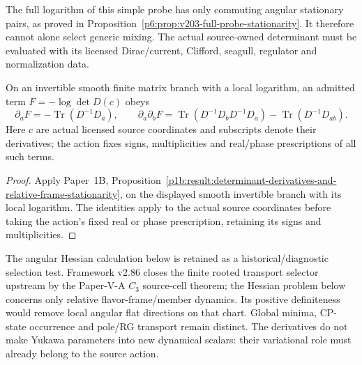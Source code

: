 \documentclass[12pt,a4paper]{article}
\begin{document}
The full logarithm of this simple probe has only commuting angular
stationary pairs, as proved in
Proposition~\ref{p6:prop:v203-full-probe-stationarity}. It therefore
cannot alone select generic mixing. The actual source-owned determinant
must be evaluated with its licensed Dirac/current, Clifford, seagull,
regulator and normalization data.

\begin{proposition}
\label{p6:prop:v203-native-determinant-derivatives}
On an invertible smooth finite matrix branch with a local logarithm,
an admitted term $F=-\log\det D(c)$ obeys
\[
 \partial_aF=-\operatorname{Tr}(D^{-1}D_a),\qquad
 \partial_a\partial_bF=
 \operatorname{Tr}(D^{-1}D_bD^{-1}D_a)-\operatorname{Tr}(D^{-1}D_{ab}).
\]
Here $c$ are actual licensed source coordinates and subscripts denote
their derivatives; the action fixes signs, multiplicities and real/phase
prescriptions of all such terms.
\end{proposition}
\begin{proof}
Apply Paper~1B,
Proposition~\ref{p1b:result:determinant-derivatives-and-relative-frame-stationarity},
on the displayed smooth invertible branch with its local logarithm.
The identities apply to the actual source coordinates before taking
the action's fixed real or phase prescription, retaining its signs and
multiplicities.
\end{proof}
The angular Hessian calculation below is retained as a historical/diagnostic selection test.  Framework v2.86 closes the finite rooted transport selector upstream by the Paper-V-A $C_3$ source-cell theorem; the Hessian problem below concerns only relative flavor-frame/member dynamics.
Its positive definiteness would remove local angular flat directions on
that chart. Global minima, CP-state occurrence and pole/RG transport remain
distinct. The derivatives do not make Yukawa parameters into new dynamical
scalars: their variational role must already belong to the source action.
\end{document}
